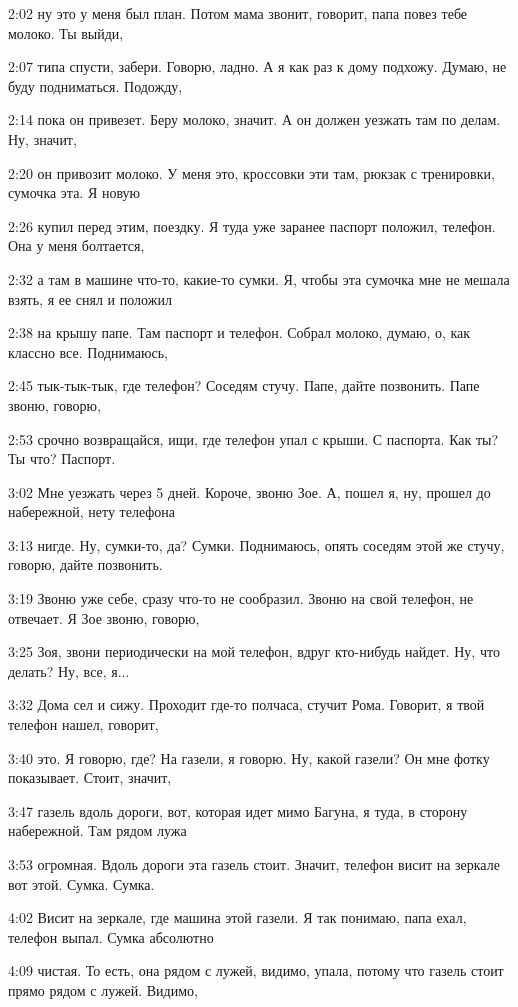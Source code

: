2:02
ну это у меня был план. Потом мама звонит, говорит, папа повез тебе молоко. Ты выйди,

2:07
типа спусти, забери. Говорю, ладно. А я как раз к дому подхожу. Думаю, не буду подниматься. Подожду,

2:14
пока он привезет. Беру молоко, значит. А он должен уезжать там по делам. Ну, значит,

2:20
он привозит молоко. У меня это, кроссовки эти там, рюкзак с тренировки, сумочка эта. Я новую

2:26
купил перед этим, поездку. Я туда уже заранее паспорт положил, телефон. Она у меня болтается,

2:32
а там в машине что-то, какие-то сумки. Я, чтобы эта сумочка мне не мешала взять, я ее снял и положил

2:38
на крышу папе. Там паспорт и телефон. Собрал молоко, думаю, о, как классно все. Поднимаюсь,

2:45
тык-тык-тык, где телефон? Соседям стучу. Папе, дайте позвонить. Папе звоню, говорю,

2:53
срочно возвращайся, ищи, где телефон упал с крыши. С паспорта. Как ты? Ты что? Паспорт.

3:02
Мне уезжать через 5 дней. Короче, звоню Зое. А, пошел я, ну, прошел до набережной, нету телефона

3:13
нигде. Ну, сумки-то, да? Сумки. Поднимаюсь, опять соседям этой же стучу, говорю, дайте позвонить.

3:19
Звоню уже себе, сразу что-то не сообразил. Звоню на свой телефон, не отвечает. Я Зое звоню, говорю,

3:25
Зоя, звони периодически на мой телефон, вдруг кто-нибудь найдет. Ну, что делать? Ну, все, я...

3:32
Дома сел и сижу. Проходит где-то полчаса, стучит Рома. Говорит, я твой телефон нашел, говорит,

3:40
это. Я говорю, где? На газели, я говорю. Ну, какой газели? Он мне фотку показывает. Стоит, значит,

3:47
газель вдоль дороги, вот, которая идет мимо Багуна, я туда, в сторону набережной. Там рядом лужа

3:53
огромная. Вдоль дороги эта газель стоит. Значит, телефон висит на зеркале вот этой. Сумка. Сумка.

4:02
Висит на зеркале, где машина этой газели. Я так понимаю, папа ехал, телефон выпал. Сумка абсолютно

4:09
чистая. То есть, она рядом с лужей, видимо, упала, потому что газель стоит прямо рядом с лужей. Видимо,

